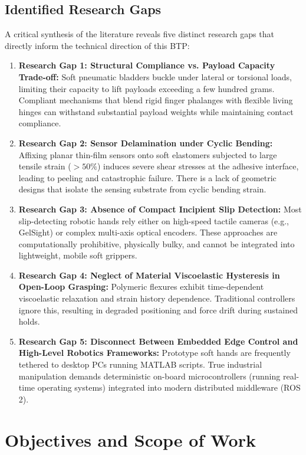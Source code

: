 \documentclass[12pt,a4paper]{report}
\begin{document}
\section{Identified Research Gaps}
A critical synthesis of the literature reveals five distinct research gaps that directly inform the technical direction of this BTP:
\begin{enumerate}
    \item \textbf{Research Gap 1: Structural Compliance vs. Payload Capacity Trade-off:} Soft pneumatic bladders buckle under lateral or torsional loads, limiting their capacity to lift payloads exceeding a few hundred grams. Compliant mechanisms that blend rigid finger phalanges with flexible living hinges can withstand substantial payload weights while maintaining contact compliance.
    \item \textbf{Research Gap 2: Sensor Delamination under Cyclic Bending:} Affixing planar thin-film sensors onto soft elastomers subjected to large tensile strain ($>50\%$) induces severe shear stresses at the adhesive interface, leading to peeling and catastrophic failure. There is a lack of geometric designs that isolate the sensing substrate from cyclic bending strain.
    \item \textbf{Research Gap 3: Absence of Compact Incipient Slip Detection:} Most slip-detecting robotic hands rely either on high-speed tactile cameras (e.g., GelSight) or complex multi-axis optical encoders. These approaches are computationally prohibitive, physically bulky, and cannot be integrated into lightweight, mobile soft grippers.
    \item \textbf{Research Gap 4: Neglect of Material Viscoelastic Hysteresis in Open-Loop Grasping:} Polymeric flexures exhibit time-dependent viscoelastic relaxation and strain history dependence. Traditional controllers ignore this, resulting in degraded positioning and force drift during sustained holds.
    \item \textbf{Research Gap 5: Disconnect Between Embedded Edge Control and High-Level Robotics Frameworks:} Prototype soft hands are frequently tethered to desktop PCs running MATLAB scripts. True industrial manipulation demands deterministic on-board microcontrollers (running real-time operating systems) integrated into modern distributed middleware (ROS 2).
\end{enumerate}

\chapter{Objectives and Scope of Work}
\end{document}
